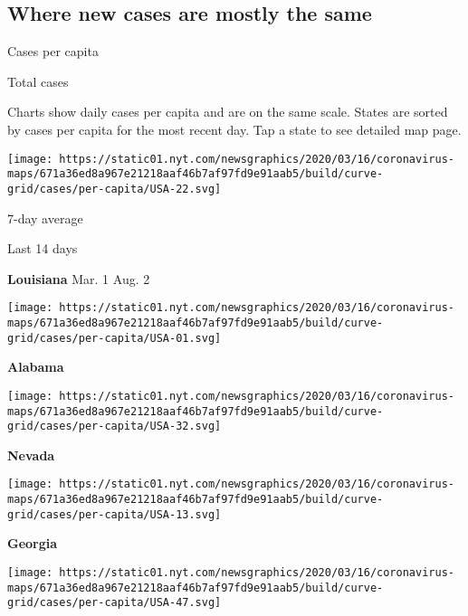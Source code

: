 \hypertarget{where-new-cases-are-mostly-the-same}{%
\subsection{Where new cases are mostly the
same}\label{where-new-cases-are-mostly-the-same}}

Cases per capita

Total cases

Charts show daily cases per capita and are on the same scale. States are
sorted by cases per capita for the most recent day. Tap a state to see
detailed map page.

\href{https://www.nytimes.com/interactive/2020/us/louisiana-coronavirus-cases.html}{}

\texttt{[image: https://static01.nyt.com/newsgraphics/2020/03/16/coronavirus-maps/671a36ed8a967e21218aaf46b7af97fd9e91aab5/build/curve-grid/cases/per-capita/USA-22.svg]}

7-day average

Last 14 days

\textbf{Louisiana} Mar. 1 Aug. 2

\href{https://www.nytimes.com/interactive/2020/us/alabama-coronavirus-cases.html}{}

\texttt{[image: https://static01.nyt.com/newsgraphics/2020/03/16/coronavirus-maps/671a36ed8a967e21218aaf46b7af97fd9e91aab5/build/curve-grid/cases/per-capita/USA-01.svg]}

\textbf{Alabama}

\href{https://www.nytimes.com/interactive/2020/us/nevada-coronavirus-cases.html}{}

\texttt{[image: https://static01.nyt.com/newsgraphics/2020/03/16/coronavirus-maps/671a36ed8a967e21218aaf46b7af97fd9e91aab5/build/curve-grid/cases/per-capita/USA-32.svg]}

\textbf{Nevada}

\href{https://www.nytimes.com/interactive/2020/us/georgia-coronavirus-cases.html}{}

\texttt{[image: https://static01.nyt.com/newsgraphics/2020/03/16/coronavirus-maps/671a36ed8a967e21218aaf46b7af97fd9e91aab5/build/curve-grid/cases/per-capita/USA-13.svg]}

\textbf{Georgia}

\href{https://www.nytimes.com/interactive/2020/us/tennessee-coronavirus-cases.html}{}

\texttt{[image: https://static01.nyt.com/newsgraphics/2020/03/16/coronavirus-maps/671a36ed8a967e21218aaf46b7af97fd9e91aab5/build/curve-grid/cases/per-capita/USA-47.svg]}

